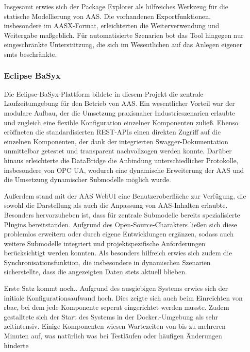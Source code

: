 Insgesamt erwies sich der Package Explorer als hilfreiches Werkzeug für die statische Modellierung von AAS.
Die vorhandenen Exportfunktionen, insbesondere im AASX-Format, erleichterten die Weiterverwendung und Weitergabe maßgeblich.
Für automatisierte Szenarien bot das Tool hingegen nur eingeschränkte Unterstützung, die sich im Wesentlichen auf das Anlegen eigener \acsp{smt} beschränkte.

\newpage
\subsubsection{Eclipse BaSyx}

Die Eclipse-BaSyx-Plattform bildete in diesem Projekt die zentrale Laufzeitumgebung für den Betrieb von AAS. 
Ein wesentlicher Vorteil war der modulare Aufbau, der die Umsetzung praxisnaher Industrieszenarien erlaubte und zugleich eine flexible Konfiguration einzelner Komponenten zuließ. 
Ebenso eröffneten die standardisierten REST-APIs einen direkten Zugriff auf die einzelnen Komponenten, der dank der integrierten Swagger-Dokumentation unmittelbar getestet und transparent nachvollzogen werden konnte. 
Darüber hinaus erleichterte die DataBridge die Anbindung unterschiedlicher Protokolle, insbesondere von OPC UA, wodurch eine dynamische Erweiterung der AAS und die Umsetzung dynamischer Submodelle möglich wurde.

Außerdem stand mit der AAS WebUI eine Benutzeroberfläche zur Verfügung, die sowohl die Darstellung als auch die Anpassung von AAS-Inhalten erlaubte. 
Besonders hervorzuheben ist, dass für zentrale Submodelle bereits spezialisierte Plugins bereitstanden. 
Aufgrund des Open-Source-Charakters ließen sich diese problemlos erweitern oder durch eigene Entwicklungen ergänzen, sodass auch weitere Submodelle integriert und projektspezifische Anforderungen berücksichtigt werden konnten. 
Als besonders hilfreich erwies sich zudem die Synchronisationsfunktion, die insbesondere in dynamischen Szenarien sicherstellte, dass die angezeigten Daten stets aktuell blieben.

Erste Satz kommt noch..
Aufgrund des ausgiebigen Systems erwies sich der initiale Konfigurationsaufwand hoch.
Dies zeigte sich auch beim Einreichten von \acs{rbac}, bei dem jede Komponente seperat eingerichtet werden musste.
Zudem gestalltete sich der Start des Systems in der Docker.-Umgebung als sehr zeitintensiv.
Einige Komponenten wiesen Wartezeiten von bis zu mehreren Minuten auf, was natürlich was bei Testläufen oder häufigen Änderungen hinderte


